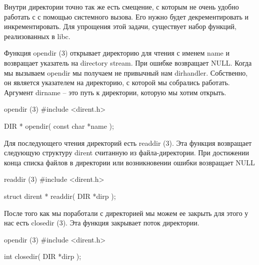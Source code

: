 Внутри директории точно так же есть смещение, с которым не очень удобно работать с с помощью системного вызова. Его нужно будет декрементировать и инкрементировать. Для упрощения этой задачи, существует набор функций, реализованных в libc. 

Функция opendir (3) открывает директорию для чтения с именем name и возвращает указатель на directory stream. При ошибке возвращает NULL. Когда мы вызываем opendir мы получаем не привычный нам dirhandler. Собственно, он является указателем на директорию, с которой мы собрались работать. Аргумент dirname -- это путь к директории, которую мы хотим открыть.

\begin{CCode}{opendir (3)}
	#include <dirent.h>

	DIR * opendir(
		const char *name
	); \end{CCode}

Для последующего чтения директорий есть readdir (3). Эта функция возвращает следующую структуру dirent считанную из файла-директории. При достижении конца списка файлов в директории или возникновении ошибки возвращает NULL

\begin{CCode}{readdir (3)}
	#include <dirent.h>

	struct dirent * readdir(
		DIR *dirp
	); \end{CCode}

После того как мы поработали с директорией мы можем ее закрыть для этого у нас есть closedir (3). Эта функция закрывает поток директории.

\begin{CCode}{opendir (3)}
	#include <dirent.h>

	int closedir(
		DIR *dirp
	); \end{CCode}